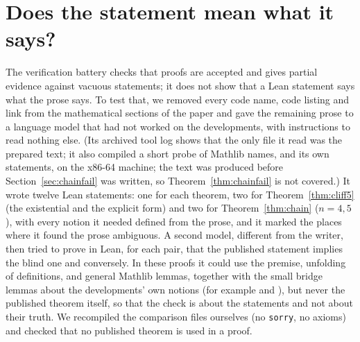 \documentclass[11pt]{article}
\theoremstyle{definition}
\theoremstyle{remark}
\newcommand{\lean}[1]{\texttt{#1}}
\begin{document}
\section{Does the statement mean what it says?}\label{sec:blind}
The verification battery checks that proofs are accepted and gives partial evidence against vacuous
statements; it does not
show that a Lean statement says what the prose says. To test that, we removed every code name, code
listing and link from the mathematical sections of the paper and gave the remaining prose to a
language model that had not worked on the developments, with instructions to read nothing else. (Its
archived tool log shows that the only file it read was the prepared text; it also compiled a short
probe of Mathlib names, and its own statements, on the x86-64 machine; the text was produced before
Section~\ref{sec:chainfail} was written, so Theorem~\ref{thm:chainfail} is not covered.) It wrote twelve
Lean statements: one for each theorem, two for Theorem~\ref{thm:cliff5} (the existential and the explicit
form) and two for Theorem~\ref{thm:chain} ($n=4,5$), with every notion it needed defined from the prose,
and it marked the places where it found the prose ambiguous. A second model, different from the
writer, then tried to prove in Lean, for each pair, that the published statement implies the blind
one and conversely. In these proofs it could use the premise, unfolding of definitions, and general
Mathlib lemmas, together with the small bridge lemmas about the developments' own notions (for example
 and ), but never the published theorem
itself, so that the check is about the statements and not about their truth. We recompiled the
comparison files ourselves (no \lean{sorry}, no axioms) and checked that no published theorem is used
in a proof.
\end{document}
